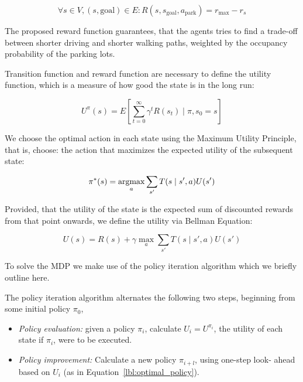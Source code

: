 \begin{equation}
\forall s \in V, (s,\mbox{goal}) \in E : R(s, s_{\mbox{goal}}, a_{\mbox{park}}) = r_{\max} - r_s
\end{equation}

The proposed reward function guarantees, that the agents tries to find a
trade-off between shorter driving and shorter walking paths, weighted by the
occupancy probability of the parking lots.

Transition function and reward function are necessary to define the utility
function, which is a measure of how good the state is in the long run:

\begin{equation}
U^{\pi}(s) = E\left[\sum_{t=0}^{\infty} \gamma^t R(s_t) \mid \pi,s_0 = s \right]
\end{equation}

We choose the optimal action in each state using the Maximum Utility
Principle, that is, choose: the action that maximizes the expected utility of
the subsequent state:

\begin{equation}
\label{lbl:optimal_policy}
\pi^*(s) = \mathop{\rm argmax}_a \sum_{s'} T(s \mid s', a)U(s')
\end{equation}

Provided, that the utility of the state is the expected sum of discounted
rewards from that point onwards, we define the utility via Bellman Equation:

\begin{equation}
\label{lbl:bellman_equation}
U(s) = R(s) + \gamma \max_a \sum_{s'}T(s \mid s', a)U(s')
\end{equation}

To solve the MDP we make use of the policy iteration algorithm which we
briefly outline here.

The policy iteration algorithm alternates the following two steps, beginning
from some initial policy $\pi_0$,

\begin{itemize}
    \item \emph{Policy evaluation:} given a policy $\pi_i$,
    calculate $U_i = U^{\pi_i}$, the utility of each state if $\pi_i$, were to be
    executed.
    \item \emph{Policy improvement:} Calculate a new policy
    $\pi_{i+l}$, using one-step look- ahead based on $U_i$ (as in
    Equation~\ref{lbl:optimal_policy}).
\end{itemize}


